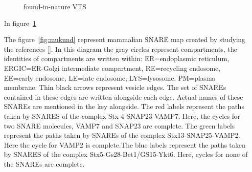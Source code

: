 
\begin{figure}[t]
  \centering
  \caption{found-in-nature VTS}
  \label{fig:mukund-vts}
\end{figure}

In figure~\ref{fig:mukund-vts}


The figure~\ref{fig:mukund} represent mammalian SNARE map created by studying the references []. In this diagram the gray circles represent compartments, the identities of compartments are
written within: ER=endoplasmic reticulum, ERGIC=ER-Golgi intermediate compartment,
RE=recycling endosome, EE=early endosome, LE=late endosome, LYS=lysosome, PM=plasma
membrane. Thin black arrows represent vesicle edges.
The set of SNAREs contained in these edges are written alongside each edge. Actual names
of these SNAREs are mentioned in the key alongside. The red labels represent the paths taken by
SNARES of the complex Stx-4-SNAP23-VAMP7. Here, the cycles for two SNARE molecules,
VAMP7 and SNAP23 are complete. The green labels represent the paths taken by SNAREs of the
complex Stx13-SNAP25-VAMP2. Here the cycle for VAMP2 is complete.The blue labels represent
the paths taken by SNARES of the complex Stx5-Gs28-Bet1/GS15-Ykt6. Here, cycles for none of
the SNAREs are complete. 

